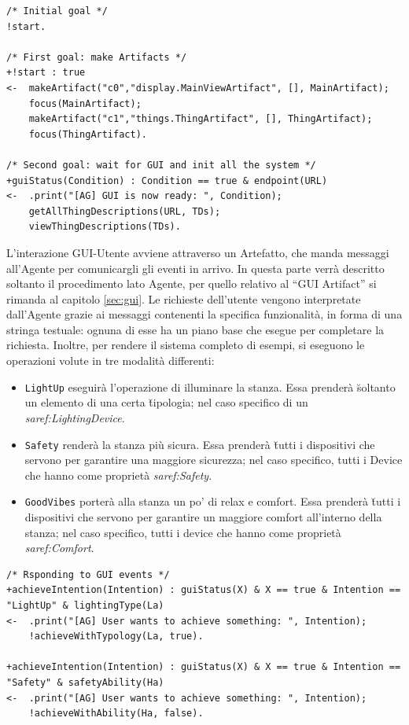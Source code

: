 \documentclass[12pt,a4paper,openright,oneside]{report}
\newcommand{\quotes}[1]{``#1''}
\begin{document}
\begin{lstlisting}
/* Initial goal */
!start.

/* First goal: make Artifacts */
+!start : true
<-  makeArtifact("c0","display.MainViewArtifact", [], MainArtifact);
	focus(MainArtifact);
	makeArtifact("c1","things.ThingArtifact", [], ThingArtifact);
	focus(ThingArtifact).

/* Second goal: wait for GUI and init all the system */
+guiStatus(Condition) : Condition == true & endpoint(URL)
<-  .print("[AG] GUI is now ready: ", Condition);
	getAllThingDescriptions(URL, TDs);
	viewThingDescriptions(TDs).
\end{lstlisting}

L'interazione GUI-Utente avviene attraverso un Artefatto, che manda messaggi all'Agente per comunicargli gli eventi in arrivo. In questa parte verrà descritto soltanto il procedimento lato Agente, per quello relativo al \quotes{GUI Artifact} si rimanda al capitolo \ref{sec:gui}. Le richieste dell'utente vengono interpretate dall'Agente grazie ai messaggi contenenti la specifica funzionalità, in forma di una stringa testuale: ognuna di esse ha un piano base che esegue per completare la richiesta. Inoltre, per rendere il sistema completo di esempi, si eseguono le operazioni volute in tre modalità differenti:

\begin{itemize}
	\itemsep0em 
	\item \texttt{LightUp} eseguirà l'operazione di illuminare la stanza. Essa prenderà \u{soltanto un} elemento di una certa \u{tipologia}; nel caso specifico di un \textit{saref:LightingDevice}.
	\item \texttt{Safety} renderà la stanza più sicura. Essa prenderà \u{tutti i dispositivi} che servono per garantire una maggiore sicurezza; nel caso specifico, tutti i Device che hanno come proprietà \textit{saref:Safety}.
	\item \texttt{GoodVibes} porterà alla stanza un po' di relax e comfort. Essa prenderà \u{tutti i dispositivi} che servono per garantire un maggiore comfort all'interno della stanza; nel caso specifico, tutti i device che hanno come proprietà \textit{saref:Comfort}.
\end{itemize}

\begin{lstlisting}
/* Rsponding to GUI events */
+achieveIntention(Intention) : guiStatus(X) & X == true & Intention == "LightUp" & lightingType(La)
<-  .print("[AG] User wants to achieve something: ", Intention);
	!achieveWithTypology(La, true).

+achieveIntention(Intention) : guiStatus(X) & X == true & Intention == "Safety" & safetyAbility(Ha)
<-  .print("[AG] User wants to achieve something: ", Intention);
	!achieveWithAbility(Ha, false).
\end{lstlisting}
\end{document}

